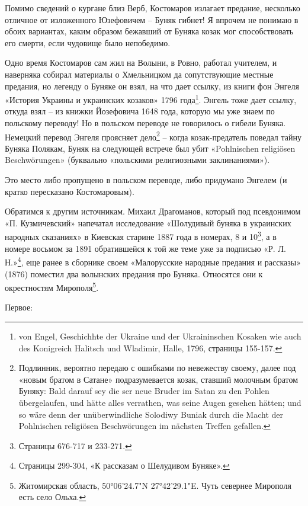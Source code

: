 Помимо сведений о кургане близ Верб, Костомаров излагает предание, несколько отличное от изложенного Юзефовичем – Буняк гибнет! Я впрочем не понимаю в обоих вариантах, каким образом бежавший от Буняка козак мог способствовать его смерти, если чудовище было непобедимо.

Одно время Костомаров сам жил на Волыни, в Ровно, работал учителем, и наверняка собирал материалы о Хмельницком да сопутствующие местные предания, но легенду о Буняке он взял, на что дает ссылку, из книги фон Энгеля «История Украины и украинских козаков» 1796 года\footnote{von Engel, Geschichhte der Ukraine und der Ukraininschen Kosaken wie auch des Konigreich Halitsch und Wladimir, Halle, 1796, страницы 155-157.}. Энгель тоже дает ссылку, откуда взял – из книжки Йозефовича 1648 года, которую мы уже знаем по польскому переводу! Но в польском переводе не говорилось о гибели Буняка. Немецкий перевод Энгеля проясняет дело\footnote{Подлинник, вероятно передаю с ошибками по невежеству своему, далее под «новым братом в Сатане» подразумевается козак, ставший молочным братом Буняку: Bald darauf sey die ser neue Bruder im Satan zu den Pohlen übergelaufen, und hätte alles verrathen, was seine Augen gesehen hätten; und so wäre denn der unüberwindliche Solodiwy Buniak durch die Macht der Pohlnischen religiösen Beschwörungen im nächsten Treffen gefallen.} – когда козак-предатель поведал тайну Буняка Полякам, Буняк на следующей встрече был убит «Pohlnischen religiösen Beschwörungen» (буквально «польскими религиозными заклинаниями»).

Это место либо пропущено в польском переводе, либо придумано Энгелем (и кратко пересказано Костомаровым).

Обратимся к другим источникам. Михаил Драгоманов, который под псевдонимом «П. Кузмичевский» напечатал исследование «Шолудивый буняка в украинских народных сказаниях» в Киевская старине 1887 года в номерах, 8 и 10\footnote{Страницы 676-717 и  233-271.}, а в номере восьмом за 1891 обратившейся к той же теме уже за подписью «Р. Л. Н.»\footnote{Страницы 299-304, «К рассказам о Шелудивом Буняке».}, еще ранее в сборнике своем  «Малорусские народные предания и рассказы» (1876) поместил два волынских предания про  Буняка. Относятся они к окрестностям Мирополя\footnote{Житомирская область, 50°06'24.7"N 27°42'29.1"E. Чуть севернее Мирополя есть село Ольха.}.

Первое:

